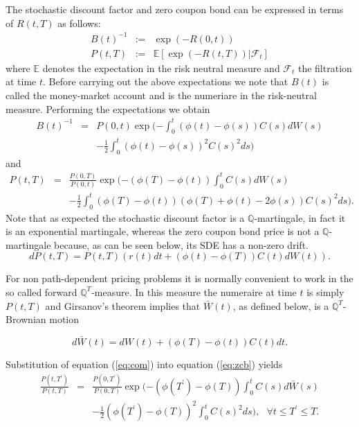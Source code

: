 The stochastic discount factor and zero coupon bond can be expressed
in terms of $R(t,T)$ as follows:
\begin{eqnarray}
B(t)^{-1} &:=&  \exp(-R(0,t)) \\
P(t,T) &:=& \mathbb E \left[ \exp(-R(t, T) )| \mathcal F_t \right]
\end{eqnarray}
where $\mathbb E$ denotes the expectation in the risk neutral measure
and $\mathcal F_t$ the filtration at time $t$. Before carrying out the
above expectations we note that $B(t)$ is called the money-market
account and is the numeriare in the risk-neutral measure. Performing
the expectations we obtain
\begin{eqnarray} \label{eq:discount}
B(t)^{-1} &=& P(0, t) \exp( -\int_0^t \left(\phi(t)-\phi(s)\right) C(s) dW(s) \\
&&- \frac{1}{2} \int_0^t \left(\phi(t)-\phi(s)\right)^2 C(s)^2 ds)
\end{eqnarray}
and
\begin{eqnarray} \label{eq:zcb}
P(t, T) &=& \frac{P(0,T)}{P(0,t)} \exp(-\left(\phi(T)-\phi(t)\right) \int_0^t C(s) dW(s)  \nonumber \\
&& -\frac{1}{2} \int_0^t \left(\phi(T)-\phi(t)\right)\left(\phi(T)+\phi(t)-2\phi(s)\right) C(s)^2 ds).
\end{eqnarray}
Note that as expected the stochastic discount factor is a $\mathbb
Q$-martingale, in fact it is an exponential martingale, whereas the
zero coupon bond price is not a $\mathbb Q$-martingale because, as can
be seen below, its SDE has a non-zero drift.
\begin{equation} dP(t,T) = P(t,T) \left(r(t) dt +
\left(\phi(t)-\phi(T)\right) C(t) dW(t)\right).
\end{equation}

For non path-dependent pricing problems it is normally convenient to
work in the so called forward $\mathbb Q^T$-measure. In this measure
the numeraire at time $t$ is simply $P(t,T)$ and Girsanov's
theorem implies that $\bar{W}(t)$, as defined below, is a $\mathbb
Q^T$-Brownian motion

\begin{equation} \label{eq:com}
d\bar{W}(t) = dW(t) + \left(\phi(T)-\phi(t)\right)C(t) dt.
\end{equation}

Substitution of equation (\ref{eq:com}) into equation (\ref{eq:zcb}) yields
\begin{eqnarray} \frac{P(t,T^{'})}{P(t,T)} &=&
\frac{P(0,T^{'})}{P(0,T)} \exp(-\left(\phi(T^{'})-\phi(T)\right)
\int_0^t C(s) d\bar{W}(s) \nonumber \\ &&-\frac{1}{2}
\left(\phi(T^{'})-\phi(T)\right)^2 \int_0^t C(s)^2 ds), ~~~\forall t
\le T^{'} \le T.
\end{eqnarray}

